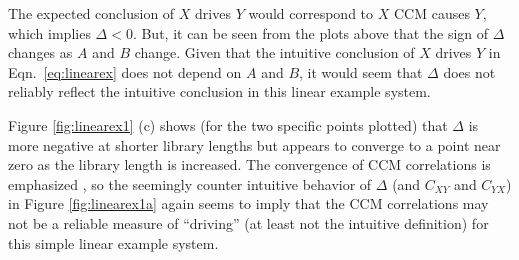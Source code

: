 \documentclass[twocolumn,aps,pre,groupedaddress]{revtex4-1}
\begin{document}
The expected conclusion of $X$ drives $Y$ would correspond to  $X$ CCM causes $Y$, which implies $\Delta<0$.  But, it can be seen from the plots above that the sign of $\Delta$ changes as $A$ and $B$ change.  Given that the intuitive conclusion of $X$ drives $Y$ in Eqn.\ \ref{eq:linearex} does not depend on $A$ and $B$, it would seem that $\Delta$ does not reliably reflect the intuitive conclusion in this linear example system.  

Figure \ref{fig:linearex1} (c) shows (for the two specific points plotted) that $\Delta$ is more negative at shorter library lengths but appears to converge to a point near zero as the library length is increased.  The convergence of CCM correlations is emphasized \cite{Sugihara2012}, so the seemingly counter intuitive behavior of $\Delta$ (and $C_{XY}$ and $C_{YX}$) in Figure \ref{fig:linearex1a} again seems to imply that the CCM correlations may not be a reliable measure of ``driving'' (at least not the intuitive definition) for this simple linear example system.
\end{document}
